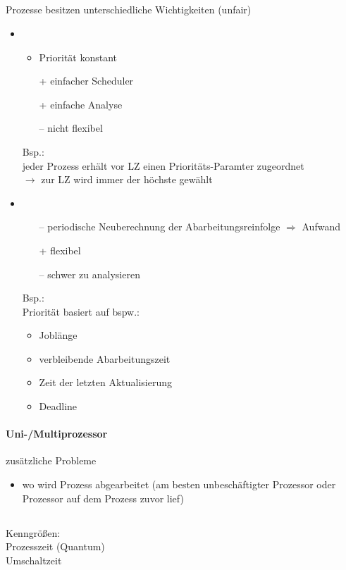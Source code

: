 \subsection[Priorisierung]{}
Prozesse besitzen unterschiedliche Wichtigkeiten (unfair)
\begin{itemize}
\item {}
\begin{itemize}
\item Priorität konstant
\item[+] einfacher Scheduler
\item[+] einfache Analyse
\item[--] nicht flexibel
\end{itemize}
Bsp.: \\
jeder Prozess erhält vor LZ einen Prioritäts-Paramter zugeordnet\\
$\to$ zur LZ wird immer der höchste gewählt
\item {}
\begin{itemize}
\item[--] periodische Neuberechnung der Abarbeitungsreinfolge $\Rightarrow$ Aufwand
\item[+] flexibel
\item[--] schwer zu analysieren
\end{itemize}
Bsp.: \\
Priorität basiert auf bspw.:
\begin{itemize}
\item Joblänge
\item verbleibende Abarbeitungszeit
\item Zeit der letzten Aktualisierung
\item Deadline
\end{itemize}
\end{itemize}

\paragraph{Uni-/Multiprozessor} zusätzliche Probleme
\begin{itemize}
\item wo wird Prozess abgearbeitet (am besten unbeschäftigter Prozessor oder Prozessor auf dem Prozess zuvor lief)
\end{itemize}

\subsection[Round-Robin]{}
Kenngrößen:\\
 \quad Prozesszeit (Quantum)\\
 \quad Umschaltzeit

